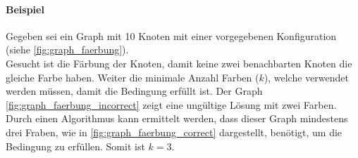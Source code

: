	\paragraph{Beispiel}
	Gegeben sei ein Graph mit 10 Knoten mit einer vorgegebenen Konfiguration (siehe \autoref{fig:graph_faerbung}).\\
	Gesucht ist die Färbung der Knoten, damit keine zwei benachbarten Knoten die gleiche Farbe haben. Weiter die minimale Anzahl Farben ($k$), welche verwendet werden müssen, damit 
	die Bedingung erfüllt ist. Der Graph \ref{fig:graph_faerbung_incorrect} zeigt eine ungültige Lösung mit zwei Farben. Durch einen Algorithmus kann ermittelt werden, dass dieser Graph 
	mindestens drei Fraben, wie in \ref{fig:graph_faerbung_correct} dargestellt, benötigt, um die Bedingung zu erfüllen. Somit ist $k=3$.
\begin{figure}[ht]
\centering
{}
\end{figure}
